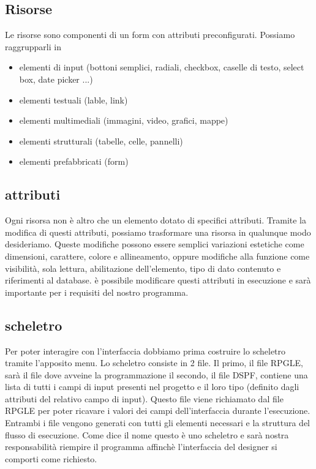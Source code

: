 \documentclass[target=bach,aauheader=,style=]{thud}
\begin{document}
\subsection{Risorse}
Le risorse sono componenti di un form con attributi preconfigurati.
Possiamo raggrupparli in
\begin{itemize}
    \item elementi di input (bottoni semplici, radiali, checkbox, caselle di testo, select box, date picker ...)
    \item elementi testuali (lable, link)
    \item elementi multimediali (immagini, video, grafici, mappe)
    \item elementi strutturali (tabelle, celle, pannelli)
    \item elementi prefabbricati (form)
\end{itemize}

\subsection{attributi}
Ogni risorsa non è altro che un elemento dotato di specifici attributi.
Tramite la modifica di questi attributi, possiamo trasformare una risorsa in qualunque modo desideriamo.
Queste modifiche possono essere semplici variazioni estetiche come dimensioni, carattere, colore e allineamento, oppure 
modifiche alla funzione come visibilità, sola lettura, abilitazione dell'elemento, tipo di dato contenuto e riferimenti al database.
è possibile modificare questi attributi in esecuzione e sarà importante per i requisiti del nostro programma.

\subsection{scheletro}
Per poter interagire con l'interfaccia dobbiamo prima costruire lo scheletro tramite l'apposito menu. 
Lo scheletro consiste in 2 file.
Il primo, il file RPGLE, sarà il file dove avveine la programmazione
il secondo, il file DSPF, contiene una lista di tutti i campi di input presenti nel progetto e il loro tipo (definito dagli attributi del relativo campo di input). 
Questo file viene richiamato dal file RPGLE per poter ricavare i valori dei campi dell'interfaccia durante l'esecuzione.
Entrambi i file vengono generati con tutti gli elementi necessari e la struttura del flusso di esecuzione.
Come dice il nome questo è uno scheletro e sarà nostra responsabilità riempire il programma affinchè l'interfaccia del designer si comporti come richiesto.
\end{document}
